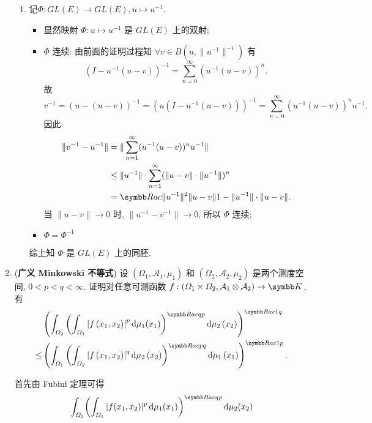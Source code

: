 \begin{enumerate}
\begin{answer}
\begin{enumerate}
        \item 记$\Phi:GL(E)\to GL(E),u\mapsto u^{-1}$.
        \begin{itemize}
        \item 显然映射 $\Phi:u\mapsto u^{-1}$ 是 $GL(E)$ 上的双射;
        \item $\Phi$ 连续: 由前面的证明过程知 $\forall v\in B(u,\|u^{-1}\|^{-1})$ 有
        \[(I-u^{-1}(u-v))^{-1}=\sum_{n=0}^{\infty}(u^{-1}(u-v))^n.\]
        故
        \[v^{-1}=(u-(u-v))^{-1}=(u(I-u^{-1}(u-v)))^{-1}=\sum_{n=0}^{\infty}(u^{-1}(u-v))^nu^{-1}.\]
        因此
        \[\begin{split}
        \|v^{-1}-u^{-1}\|
        &=\|\sum_{n=1}^{\infty}(u^{-1}(u-v))^nu^{-1}\|\\
        &\leq\|u^{-1}\|\cdot\sum_{n=1}^{\infty}(\|u-v\|\cdot\|u^{-1}\|)^n\\
        &=\R ac{\|u^{-1}\|^2\|u-v\|}{1-\|u^{-1}\|\cdot\|u-v\|}.
        \end{split}\]
        当 $\|u-v\|\to 0$ 时, $\|u^{-1}-v^{-1}\|\to 0$, 所以 $\Phi$ 连续;
        \item $\Phi=\Phi^{-1}$
        \end{itemize}
        综上知 $\Phi$ 是 $GL(E)$ 上的同胚.
      \end{enumerate}
    \end{answer}
  \item (\textbf{广义 Minkowski 不等式}) 
  设 $\left(\varOmega_{1}, \mathcal{A}_{1}, \mu_{1}\right)$ 
  和 $\left(\varOmega_{2}, \mathcal{A}_{2}, \mu_{2}\right)$ 是两个测度空间, $0<p<q<\infty$. 
  证明对任意可测函数 
    $f:\left(\varOmega_{1} \times \varOmega_{2}, \mathcal{A}_{1} \otimes \mathcal{A}_{2}\right) \rightarrow\K$, 有
    \begin{align*}
        &\left(\int_{\varOmega_{2}}\left(\int_{\varOmega_{1}}\left|f\left(x_{1}, x_{2}\right)\right|^{p}\diff\mu_{1}(x_{1})\right)^{\R ac{q}{p}}\diff \mu_{2}\left(x_{2}\right)\right)^{\R ac{1}{q}} \\
      \leq &\left(\int_{\varOmega_{1}}\left(\int_{\varOmega_{2}}\left|f\left(x_{1}, x_{2}\right)\right|^{q}\diff\mu_{2}\left(x_{2}\right)\right)^{\R ac{p}{q}}\diff\mu_{1}\left(x_{1}\right)\right)^{\R ac{1}{p}}.
    \end{align*}
    \begin{answer}
      首先由 Fubini 定理可得
      \begin{align*}
          & \int_{\varOmega_2}\biggl(\int_{\varOmega_1}|f(x_1,x_2)|^p\diff\mu_1(x_1)\biggr)^{\R ac{q}{p}}\diff\mu_2(x_2) \\

\end{align*}
\end{answer}
\end{enumerate}
